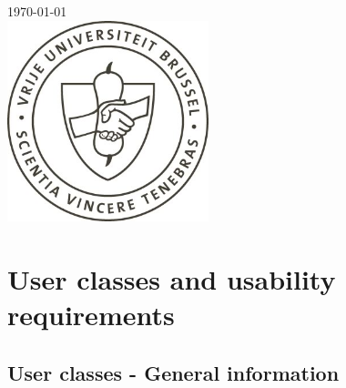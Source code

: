 \documentclass[11pt, a4paper,svglistings]{report}
\begin{document}
\begin{titlepage}
{\large \today}\\[3cm]


\includegraphics[width=2.3in]{vub_schild.jpg}\\[4cm] 
 







\end{titlepage}

\tableofcontents

\listoffigures

\newpage

\chapter{User classes and usability requirements}

\section{User classes - General information}
\end{document}
